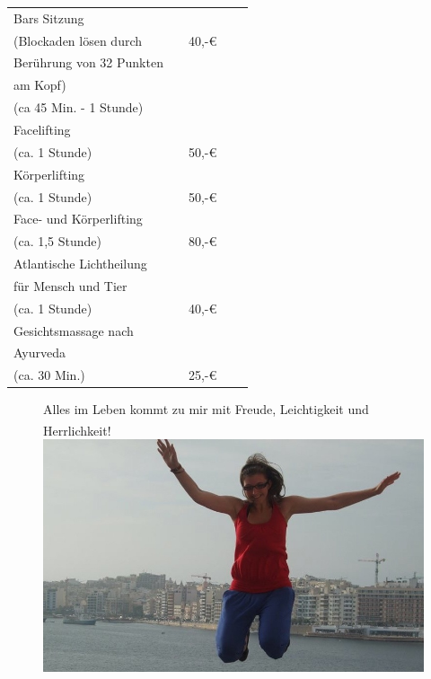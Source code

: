 \documentclass[10pt,foldmark,notumble]{leaflet}
\begin{document}
 \begin{tabular}{p{40mm}llcc}\hline\hline
Bars Sitzung              &     &  \\
(Blockaden lösen durch & & 40,-€ \\
Berührung von 32 Punkten & & \\
am Kopf) & & \\
(ca 45 Min. - 1 Stunde)  &   &  \\
\hline
Facelifting   &   &  \\
(ca. 1 Stunde) & & 50,-€\\
\hline
Körperlifting   &   &  \\
(ca. 1 Stunde) & & 50,-€\\
\hline
Face- und Körperlifting   &   &  \\
(ca. 1,5 Stunde) & & 80,-€\\
 \hline
Atlantische Lichtheilung   &   &  \\
für Mensch und Tier & & \\
(ca. 1 Stunde) & & 40,-€ \\
\hline
Gesichtsmassage nach  &   &  \\
Ayurveda & & \\
(ca. 30 Min.) & & 25,-€ \\
\hline
\end{tabular}



\newpage

\vspace*{20mm}
\begin{figure}[h!]
 { \large Alles im Leben kommt zu mir mit Freude, Leichtigkeit und Herrlichkeit!\textsuperscript{\textregistered}} 
\includegraphics [scale=.489, angle=270 ]{Bild3.jpg}
\end{figure}
\end{document}
